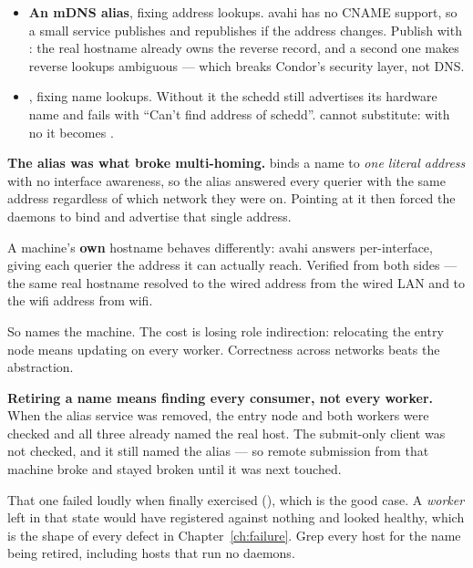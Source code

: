 \begin{itemize}
  \item \textbf{An mDNS alias}, fixing address lookups. avahi has no CNAME
        support, so a small service publishes  and
        republishes if the address changes. Publish with : the real
        hostname already owns the reverse record, and a second one makes reverse
        lookups ambiguous --- which breaks Condor's security layer, not DNS.
  \item \textbf{}, fixing name lookups. Without it the
        schedd still advertises its hardware name and  fails
        with ``Can't find address of schedd''.  cannot
        substitute: with no  it becomes
        .
\end{itemize}

\begin{trap}
\textbf{The alias was what broke multi-homing.}  binds a
name to \emph{one literal address} with no interface awareness, so the alias
answered every querier with the same address regardless of which network they
were on. Pointing  at it then forced the daemons to bind
and advertise that single address.
\end{trap}

A machine's \textbf{own} hostname behaves differently: avahi answers
per-interface, giving each querier the address it can actually reach. Verified
from both sides --- the same real hostname resolved to the wired address from the
wired LAN and to the wifi address from wifi.

So  names the machine. The cost is losing role indirection:
relocating the entry node means updating  on every worker.
Correctness across networks beats the abstraction.

\begin{trap}
\textbf{Retiring a name means finding every consumer, not every worker.} When
the alias service was removed, the entry node and both workers were checked and
all three already named the real host. The submit-only client was not checked,
and it still named the alias --- so remote submission from that machine broke
and stayed broken until it was next touched.
\end{trap}

That one failed loudly when finally exercised (), which
is the good case. A \emph{worker} left in that state would have registered
against nothing and looked healthy, which is the shape of every defect in
Chapter~\ref{ch:failure}. Grep every host for the name being retired, including
hosts that run no daemons.

